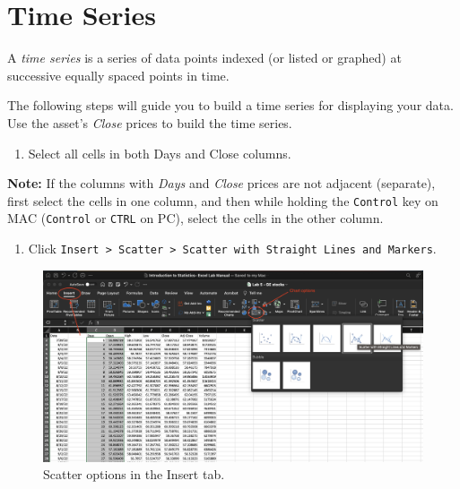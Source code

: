 \documentclass[
]{book}
\providecommand{\tightlist}{%
  \setlength{\itemsep}{0pt}\setlength{\parskip}{0pt}}
\begin{document}
\hypertarget{time-series-1}{%
\section{Time Series}\label{time-series-1}}

A \emph{time series} is a series of data points indexed (or listed or graphed) at successive equally spaced points in time.

The following steps will guide you to build a time series for displaying your data. Use the asset's \emph{Close} prices to build the time series.

\begin{enumerate}
\def\labelenumi{\arabic{enumi}.}
\tightlist
\item
  Select all cells in both Days and Close columns.
\end{enumerate}

\textbf{Note:} If the columns with \emph{Days} and \emph{Close} prices are not adjacent (separate), first select the cells in one column, and then while holding the \texttt{Control} key on MAC (\texttt{Control} or \texttt{CTRL} on PC), select the cells in the other column.

\begin{enumerate}
\def\labelenumi{\arabic{enumi}.}
\setcounter{enumi}{1}
\tightlist
\item
  Click \texttt{Insert\ \textgreater{}\ Scatter\ \textgreater{}\ Scatter\ with\ Straight\ Lines\ and\ Markers}.
\end{enumerate}

\begin{figure}

{\centering \includegraphics[width=0.95\linewidth]{scatter-options} 

}

\caption{Scatter options in the Insert tab.}\label{fig:scatter-options}
\end{figure}
\end{document}
